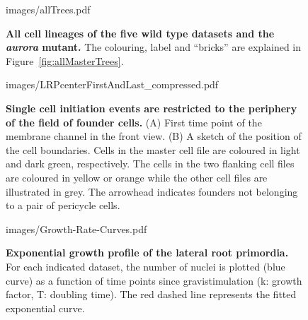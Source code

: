\documentclass[11pt,a4paper, final]{article}
\begin{document}
\clearpage
%
%
\begin{sidewaysfigure}
\centering
		\begin{overpic}[width=1.\linewidth]{images/allTrees.pdf}
		\end{overpic}
\caption[All cell lineages of the five wild type datasets and the \emph{aurora} mutant.]
{
{\bf All cell lineages of the five wild type datasets and the \emph{aurora} mutant.} The colouring, label and ``bricks'' are explained in Figure~\ref{fig:allMasterTrees}.
}
	\label{fig:allTrees}
\end{sidewaysfigure}
\clearpage
%
\begin{figure}[htbp]
\centering
	\begin{overpic}[width=0.5\linewidth]{images/LRPcenterFirstAndLast_compressed.pdf}
	\end{overpic}
\caption[Single cell initiation events are restricted to the periphery of the field of founder cells.]
{{\bf Single cell initiation events are restricted to the periphery of the field of founder cells.} (A) First time point of the membrane channel in the front view. (B) A sketch of the position of the cell boundaries. Cells in the master cell file are coloured in light and dark green, respectively. The cells in the two flanking cell files are coloured in yellow or orange while the other cell files are illustrated in grey. The arrowhead indicates founders not belonging to a pair of pericycle cells.}
	\label{fig:founderstop}
\end{figure}
%
\clearpage
%
%
\begin{figure}[htbp]
\centering
	\begin{overpic}[width=1.\linewidth]{images/Growth-Rate-Curves.pdf}
	\end{overpic}
\caption[Exponential growth profile of the lateral root primordia.]
{{\bf Exponential growth profile of the lateral root primordia.} For each indicated dataset, the number of nuclei is plotted (blue curve) as a function of time points since gravistimulation (k: growth factor, T: doubling time). The red dashed line represents the fitted exponential curve.}
	\label{fig:growthcurves}
\end{figure}
%
\end{document}
